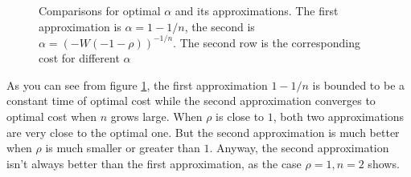 \begin{figure}
  \caption{Comparisons for optimal  $\alpha$ and its approximations. The first
  approximation is $\alpha = 1-1/n$, the second is $\alpha =
  (-W(-1-\rho))^{-1/n}$. The second row is the corresponding cost for different
  $\alpha$} 
  \label{fig:alpha}
\end{figure}

As you can see from figure \ref{fig:alpha}, the first approximation $1-1/n$ is bounded
to be a constant time of optimal cost while the second approximation converges to optimal
cost when $n$ grows large. When $\rho$ is close to $1$, both two
approximations are very close to the optimal one. But the second approximation is much better
when $\rho$ is much smaller or greater than $1$. Anyway, the second approximation isn't always
better than the first approximation, as the case $\rho = 1, n = 2$ shows.

